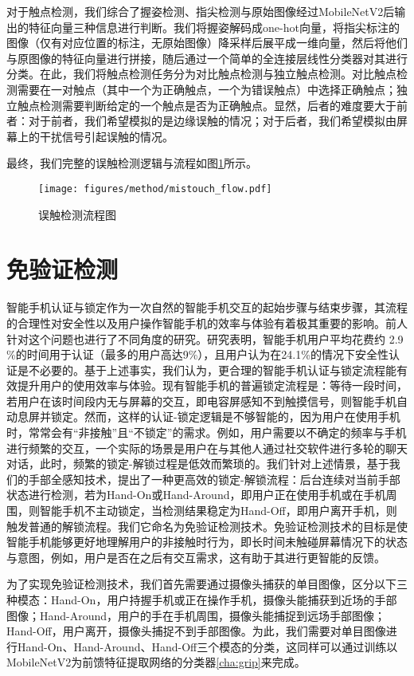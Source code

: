 对于触点检测，我们综合了握姿检测、指尖检测与原始图像经过MobileNetV2后输出的特征向量三种信息进行判断。我们将握姿解码成one-hot向量，将指尖标注的图像（仅有对应位置的标注，无原始图像）降采样后展平成一维向量，然后将他们与原图像的特征向量进行拼接，随后通过一个简单的全连接层线性分类器对其进行分类。在此，我们将触点检测任务分为对比触点检测与独立触点检测。对比触点检测需要在一对触点（其中一个为正确触点，一个为错误触点）中选择正确触点；独立触点检测需要判断给定的一个触点是否为正确触点。显然，后者的难度要大于前者：对于前者，我们希望模拟的是边缘误触的情况；对于后者，我们希望模拟由屏幕上的干扰信号引起误触的情况。

最终，我们完整的误触检测逻辑与流程如图\ref{fig:mistouch_flow}所示。

\begin{figure}[h]
  \centering
  \texttt{[image: figures/method/mistouch\_flow.pdf]}
  \caption{误触检测流程图}
  \label{fig:mistouch_flow}
\end{figure}

\section{免验证检测}

智能手机认证与锁定作为一次自然的智能手机交互的起始步骤与结束步骤，其流程的合理性对安全性以及用户操作智能手机的效率与体验有着极其重要的影响。前人针对这个问题也进行了不同角度的研究。研究表明，智能手机用户平均花费约 2.9 \%的时间用于认证（最多的用户高达9\%），且用户认为在24.1\%的情况下安全性认证是不必要的\cite{185310}。基于上述事实，我们认为，更合理的智能手机认证与锁定流程能有效提升用户的使用效率与体验。现有智能手机的普遍锁定流程是：等待一段时间，若用户在该时间段内无与屏幕的交互，即电容屏感知不到触摸信号，则智能手机自动息屏并锁定。然而，这样的认证-锁定逻辑是不够智能的，因为用户在使用手机时，常常会有“非接触”且“不锁定”的需求。例如，用户需要以不确定的频率与手机进行频繁的交互，一个实际的场景是用户在与其他人通过社交软件进行多轮的聊天对话，此时，频繁的锁定-解锁过程是低效而繁琐的。我们针对上述情景，基于我们的手部全感知技术，提出了一种更高效的锁定-解锁流程：后台连续对当前手部状态进行检测，若为Hand-On或Hand-Around，即用户正在使用手机或在手机周围，则智能手机不主动锁定，当检测结果稳定为Hand-Off，即用户离开手机，则触发普通的解锁流程。我们它命名为免验证检测技术。免验证检测技术的目标是使智能手机能够更好地理解用户的非接触时行为，即长时间未触碰屏幕情况下的状态与意图，例如，用户是否在之后有交互需求，这有助于其进行更智能的反馈。

为了实现免验证检测技术，我们首先需要通过摄像头捕获的单目图像，区分以下三种模态：Hand-On，用户持握手机或正在操作手机，摄像头能捕获到近场的手部图像；Hand-Around，用户的手在手机周围，摄像头能捕捉到远场手部图像；Hand-Off，用户离开，摄像头捕捉不到手部图像。为此，我们需要对单目图像进行Hand-On、Hand-Around、Hand-Off三个模态的分类，这同样可以通过训练以MobileNetV2为前馈特征提取网络的分类器\ref{cha:grip}来完成。

